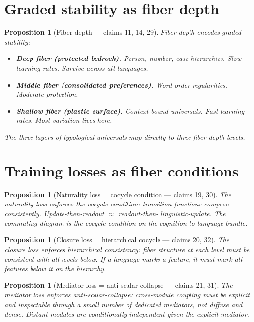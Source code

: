 \documentclass[11pt,a4paper]{article}
\newtheorem{proposition}[definition]{Proposition}
\begin{document}
\section{Graded stability as fiber depth}

\begin{proposition}[Fiber depth --- claims 11, 14, 29]
\label{prop:depth}
Fiber depth encodes graded stability:
\begin{itemize}
  \item \textbf{Deep fiber (protected bedrock).} Person, number, case
    hierarchies. Slow learning rates. Survive across all languages.
  \item \textbf{Middle fiber (consolidated preferences).} Word-order
    regularities. Moderate protection.
  \item \textbf{Shallow fiber (plastic surface).} Context-bound universals.
    Fast learning rates. Most variation lives here.
\end{itemize}
The three layers of typological universals map directly to three fiber
depth levels.
\end{proposition}

\section{Training losses as fiber conditions}

\begin{proposition}[Naturality loss = cocycle condition --- claims 19, 30]
\label{prop:naturality}
The naturality loss enforces the cocycle condition: transition functions
compose consistently. Update-then-readout $\approx$ readout-then-
linguistic-update. The commuting diagram is the cocycle condition on the
cognition-to-language bundle.
\end{proposition}

\begin{proposition}[Closure loss = hierarchical cocycle --- claims 20, 32]
\label{prop:closure}
The closure loss enforces hierarchical consistency: fiber structure at
each level must be consistent with all levels below. If a language marks
a feature, it must mark all features below it on the hierarchy.
\end{proposition}

\begin{proposition}[Mediator loss = anti-scalar-collapse --- claims 21, 31]
\label{prop:mediator}
The mediator loss enforces anti-scalar-collapse: cross-module coupling
must be explicit and inspectable through a small number of dedicated
mediators, not diffuse and dense. Distant modules are conditionally
independent given the explicit mediator.
\end{proposition}
\end{document}
